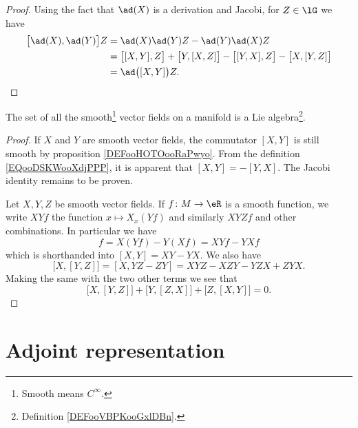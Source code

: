\begin{proof}
	Using the fact that \( \ad(X)\) is a derivation and Jacobi, for \( Z\in\lG\) we have
	\begin{subequations}
		\begin{align}
			\big[ \ad(X),\ad(Y) \big]Z & =\ad(X)\ad(Y)Z-\ad(Y)\ad(X)Z                                                     \\
			                           & =\big[ [X,Y],Z \big]+\big[ Y,[X,Z] \big]-\big[ [Y,X],Z \big]-\big[ X,[Y,Z] \big] \\
			                           & =\ad\big( [X,Y] \big)Z.
		\end{align}
	\end{subequations}
\end{proof}

\begin{proposition}       \label{PROPooSWQSooSEfTuX}
	The set of all the smooth\footnote{Smooth means \( C^{\infty}\).} vector fields on a manifold is a Lie algebra\footnote{Definition \ref{DEFooVBPKooGxlDBn}.}.
\end{proposition}

\begin{proof}
	If \( X\) and \( Y\) are smooth vector fields, the commutator \( [X,Y]\) is still smooth by proposition \ref{DEFooHOTOooRaPwyo}. From the definition \eqref{EQooDSKWooXdjPPP}, it is apparent that \( [X,Y]=-[Y,X]\). The Jacobi identity remains to be proven.

	Let \( X,Y,Z\) be smooth vector fields. If \( f\colon M\to \eR\) is a smooth function, we write \( XYf\) the function \( x\mapsto X_x(Yf)\) and similarly \( XYZf\) and other combinations. In particular we have
	\begin{equation}
		[X,Y]f=X(Yf)-Y(Xf)=XYf-YXf
	\end{equation}
	which is shorthanded into \( [X,Y]=XY-YX\). We also have
	\begin{equation}
		\big[ X, [Y,Z] \big]=[X,YZ-ZY]=XYZ-XZY-YZX+ZYX.
	\end{equation}
	Making the same with the two other terms we see that
	\begin{equation}
		\big[ X,[Y,Z] \big]+\big[ Y,[Z,X] \big]+\big[ Z,[X,Y] \big]=0.
	\end{equation}
\end{proof}

\section{Adjoint representation}

